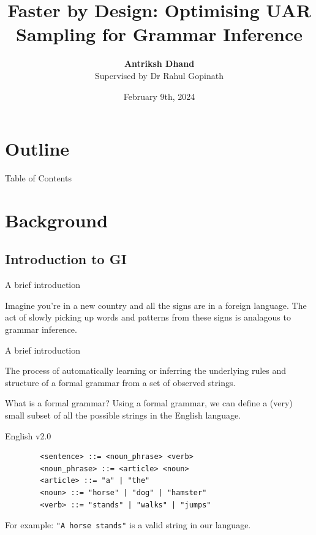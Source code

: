 \documentclass{beamer}
\title[Optimising UAR Sampling]{Faster by Design: Optimising UAR Sampling for Grammar Inference}
\author[Antriksh Dhand]{\textbf{Antriksh Dhand}\\{\small Supervised by Dr Rahul Gopinath}}
\date{February 9th, 2024}
\institute[USYD]
{
	School of Computer Science\\
	The University of Sydney
}
\begin{document}
	\begin{frame}
	\titlepage
	\end{frame}

	\section*{Outline}

	\begin{frame}{Table of Contents}
	\tableofcontents
	\end{frame}

	\section{Background}

	\subsection{Introduction to GI}
	\begin{frame}{A brief introduction}

		Imagine you're in a new country and all the signs are in a foreign language. The act of slowly picking up words and patterns from these signs is analagous to grammar inference.
	
	\end{frame}

	\begin{frame}{A brief introduction}

		\begin{definition}
			The process of automatically learning or inferring the \alert{underlying rules and structure} of a formal grammar from a set of observed strings.	
		\end{definition}
	
	\end{frame}

\begin{frame}[fragile]{What is a formal grammar?}
	Using a formal grammar, we can define a (very) small subset of all the possible strings in the English language.
	\begin{exampleblock}{English v2.0}
		\begin{verbatim}
		<sentence> ::= <noun_phrase> <verb>
		<noun_phrase> ::= <article> <noun>
		<article> ::= "a" | "the"
		<noun> ::= "horse" | "dog" | "hamster"
		<verb> ::= "stands" | "walks" | "jumps"
		\end{verbatim}
		For example: \texttt{"A horse stands"} is a valid string in our language.
	\end{exampleblock}
\end{frame}
\end{document}
